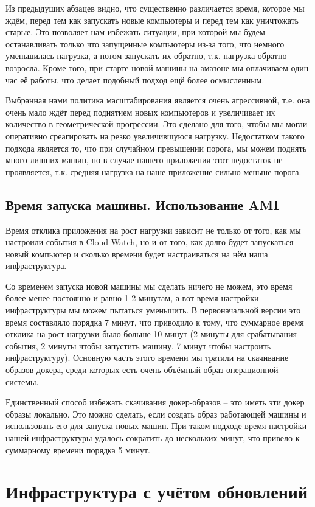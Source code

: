 	Из предыдущих абзацев видно, что существенно различается время, которое мы ждём, перед тем как запускать новые компьютеры и перед тем как уничтожать старые. Это позволяет нам избежать ситуации, при которой мы будем останавливать только что запущенные компьютеры из-за того, что немного уменьшилась нагрузка, а потом запускать их обратно, т.к. нагрузка обратно возросла. Кроме того, при старте новой машины на амазоне мы оплачиваем один час её работы, что делает подобный подход ещё более осмысленным.
	
	Выбранная нами политика масштабирования является очень агрессивной, т.е. она очень мало ждёт перед поднятием новых компьютеров и увеличивает их количество в геометрической прогрессии. Это сделано для того, чтобы мы могли оперативно среагировать на резко увеличившуюся нагрузку. Недостатком такого подхода является то, что при случайном превышении порога, мы можем поднять много лишних машин, но в случае нашего приложения этот недостаток не проявляется, т.к. средняя нагрузка на наше приложение сильно меньше порога.
	
\subsection{Время запуска машины. Использование AMI}
	Время отклика приложения на рост нагрузки зависит не только от того, как мы настроили события в Cloud Watch, но и от того, как долго будет запускаться новый компьютер и сколько времени будет настраиваться на нём наша инфраструктура. 
	
	Со временем запуска новой машины мы сделать ничего не можем, это время более-менее постоянно и равно 1-2 минутам, а вот время настройки инфраструктуры мы можем пытаться уменьшить. В первоначальной версии это время составляло порядка 7 минут, что приводило к тому, что суммарное время отклика на рост нагрузки было больше 10 минут (2 минуты для срабатывания события, 2 минуты чтобы запустить машину, 7 минут чтобы настроить инфраструктуру). Основную часть этого времени мы тратили на скачивание образов докера, среди которых есть очень объёмный образ операционной системы.
	
	Единственный способ избежать скачивания докер-образов -- это иметь эти докер образы локально. Это можно сделать, если создать образ работающей машины и использовать его для запуска новых машин. При таком подходе время настройки нашей инфраструктуры удалось сократить до нескольких минут, что привело к суммарному времени порядка 5 минут. 
\section{Инфраструктура с учётом обновлений}

